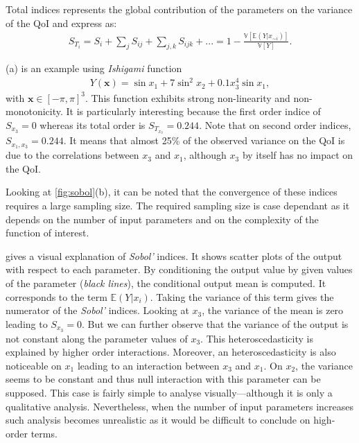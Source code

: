 Total indices represents the global contribution of the parameters on the variance of the QoI and express as:
\begin{align}
S_{T_i} = S_i + \sum_j S_{ij} + \sum_{j,k} S_{ijk} + ... = 1 - \frac{\mathbb{V}[\mathbb{E}(Y|x_{\sim i})]}{\mathbb{V}[Y]}.
\end{align}

(a) is an example using \textit{Ishigami} function~\cite{ishigami1990}
\begin{align}
Y(\mathbf{x}) = \sin x_1 + 7 \sin^2 x_2 + 0.1 x_3^4 \sin x_1,
\end{align}
\noindent with $\mathbf{x} \in [-\pi, \pi]^3$. This function exhibits strong non-linearity and non-monotonicity. It is particularly interesting because the first order indice of $S_{x_3} = 0$ whereas its total order is $S_{T_{x_3}} = 0.244$. Note that on second order indices, $S_{x_1,x_3} = 0.244$. It means that almost 25\% of the observed variance on the QoI is due to the correlations between $x_3$ and $x_1$, although $x_3$ by itself has no impact on the QoI.

Looking at \cref{fig:sobol}(b), it can be noted that the convergence of these indices requires a large sampling size. The required sampling size is case dependant as it depends on the number of input parameters and on the complexity of the function of interest.

 gives a visual explanation of \emph{Sobol'} indices. It shows scatter plots of the output with respect to each parameter. By conditioning the output value by given values of the parameter (\emph{black lines}), the conditional output mean is computed. It corresponds to the term $\mathbb{E}(Y|x_i)$. Taking the variance of this term gives the numerator of the \emph{Sobol'} indices. Looking at $x_3$, the variance of the mean is zero leading to $S_{x_3} = 0$. But we can further observe that the variance of the output is not constant along the parameter values of $x_3$. This heteroscedasticity is explained by higher order interactions. Moreover, an heteroscedasticity is also noticeable on $x_1$ leading to an interaction between $x_3$ and $x_1$. On $x_2$, the variance seems to be constant and thus null interaction with this parameter can be supposed. This case is fairly simple to analyse visually---although it is only a qualitative analysis. Nevertheless, when the number of input parameters increases such analysis becomes unrealistic as it would be difficult to conclude on high-order terms.

